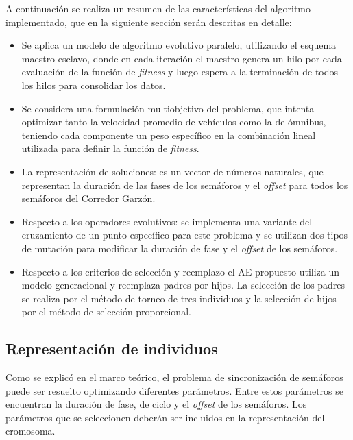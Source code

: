 A continuación se realiza un resumen de las características del algoritmo implementado, que en la siguiente sección serán descritas en detalle:
\begin{itemize}
	
	\item Se aplica un modelo de algoritmo evolutivo paralelo, utilizando el esquema maestro-esclavo, donde en cada iteración el maestro genera un hilo por cada evaluación de la función de \emph{fitness} y luego espera a la terminación de todos los hilos para consolidar los datos. 
	\item Se considera una formulación multiobjetivo del problema, que intenta optimizar tanto la velocidad promedio de vehículos como la de ómnibus, teniendo cada componente un peso específico en la combinación lineal utilizada para definir la función de \emph{fitness}.
	\item La representación de soluciones: es un vector de números naturales, que representan la duración de las fases de los semáforos y el \emph{offset} para todos los semáforos del Corredor Garzón.
	\item Respecto a los operadores evolutivos: se implementa una variante del cruzamiento de un punto específico para este problema y se utilizan dos tipos de mutación para modificar la duración de fase y el \emph{offset} de los semáforos.
	\item Respecto a los criterios de selección y reemplazo el AE propuesto utiliza un modelo generacional y reemplaza padres por hijos. La selección de los padres se realiza por el método de torneo de tres individuos y la selección de hijos por el método de selección proporcional.
	
\end{itemize}

\subsection{Representación de individuos}

Como se explicó en el marco teórico, el problema de sincronización de semáforos puede ser resuelto optimizando diferentes parámetros. Entre estos parámetros se encuentran la duración de fase, de ciclo y el \emph{offset} de los semáforos. Los parámetros que se seleccionen deberán ser incluidos en la representación del cromosoma.

